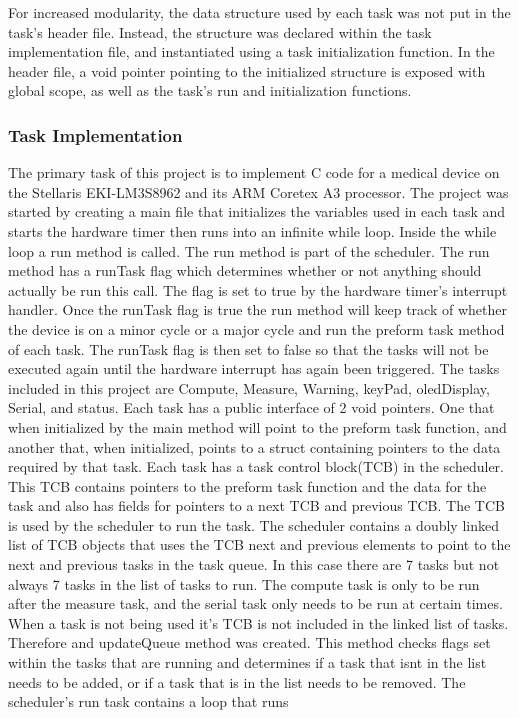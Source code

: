 \documentclass[12pt]{article} %
\begin{document}
    For increased modularity, the data structure used by each task was not put in
    the task's header file. Instead, the structure was declared within the task
    implementation file, and instantiated using a task initialization function. In
    the header file, a void pointer pointing to the initialized structure is
    exposed with global scope, as well as the task's run and initialization functions.

    \subsubsection{Task Implementation}


    The primary task of this project is to implement C code for a medical device on
    the Stellaris EKI-LM3S8962 and its ARM Coretex A3 processor. The project was
    started by creating a main file that initializes the variables used in each
    task and starts the hardware timer then runs into an infinite while loop. Inside the while loop a run method
    is called. The run method is part of the scheduler. The run method has a runTask flag which determines whether or not anything should actually be run this call. The flag is set to true by the hardware timer's interrupt handler. Once the runTask flag is true the run method will keep track of
    whether the device is on a minor cycle or a major cycle and run the preform
    task method of each task. The runTask flag is then set to false so that the tasks will not be executed again until the hardware interrupt has again been triggered. The tasks included in this project are Compute,
    Measure, Warning, keyPad, oledDisplay, Serial, and status. Each task has a public interface of
    2 void pointers. One that when initialized by the main method will point to the
    preform task function, and another that, when initialized, points to a struct
    containing pointers to the data required by that task. Each task has a task
    control block(TCB) in the scheduler. This TCB contains pointers to the
    preform task function and the data for the task and also has fields for pointers to a next TCB and previous TCB. The TCB is used by the
    scheduler to run the task. The scheduler contains a doubly linked list of TCB objects that uses the TCB next and previous elements to point to the next and previous tasks in the task queue. In this case there are 7 tasks but not always 7 tasks in the list of tasks to run. The compute task is only to be run after the measure task, and the serial task only needs to be run at certain times. When a task is not being used it's TCB is not included in the linked list of tasks. Therefore and updateQueue method was created. This method checks flags set within the tasks that are running and determines if a task that isnt in the list needs to be added, or if a task that is in the list needs to be removed. The scheduler's run task contains a loop that runs
\end{document}
